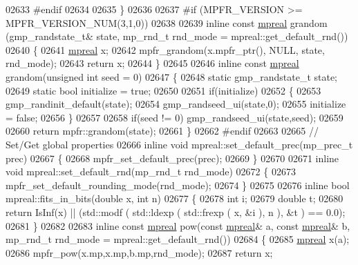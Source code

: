 \begin{DoxyCode}
{{02633 \textcolor{preprocessor}{#endif}
02634 
02635 \}
02636 
02637 \textcolor{preprocessor}{#if (MPFR\_VERSION >= MPFR\_VERSION\_NUM(3,1,0))}
02638 
02639 \textcolor{keyword}{inline} \textcolor{keyword}{const} \hyperlink{classmpfr_1_1mpreal}{mpreal} grandom (gmp\_randstate\_t& state, mp\_rnd\_t rnd\_mode = mpreal::get\_default\_rnd())
02640 \{
02641     \hyperlink{classmpfr_1_1mpreal}{mpreal} x;
02642     mpfr\_grandom(x.mpfr\_ptr(), NULL, state, rnd\_mode);
02643     \textcolor{keywordflow}{return} x;
02644 \}
02645 
02646 \textcolor{keyword}{inline} \textcolor{keyword}{const} \hyperlink{classmpfr_1_1mpreal}{mpreal} grandom(\textcolor{keywordtype}{unsigned} \textcolor{keywordtype}{int} seed = 0)
02647 \{
02648     \textcolor{keyword}{static} gmp\_randstate\_t state;
02649     \textcolor{keyword}{static} \textcolor{keywordtype}{bool} initialize = \textcolor{keyword}{true};
02650 
02651     \textcolor{keywordflow}{if}(initialize)
02652     \{
02653         gmp\_randinit\_default(state);
02654         gmp\_randseed\_ui(state,0);
02655         initialize = \textcolor{keyword}{false};
02656     \}
02657 
02658     \textcolor{keywordflow}{if}(seed != 0) gmp\_randseed\_ui(state,seed);
02659 
02660     \textcolor{keywordflow}{return} mpfr::grandom(state);
02661 \}
02662 \textcolor{preprocessor}{#endif}
02663 
02665 \textcolor{comment}{// Set/Get global properties}
02666 \textcolor{keyword}{inline} \textcolor{keywordtype}{void} mpreal::set\_default\_prec(mp\_prec\_t prec)
02667 \{
02668     mpfr\_set\_default\_prec(prec);
02669 \}
02670 
02671 \textcolor{keyword}{inline} \textcolor{keywordtype}{void} mpreal::set\_default\_rnd(mp\_rnd\_t rnd\_mode)
02672 \{
02673     mpfr\_set\_default\_rounding\_mode(rnd\_mode);
02674 \}
02675 
02676 \textcolor{keyword}{inline} \textcolor{keywordtype}{bool} mpreal::fits\_in\_bits(\textcolor{keywordtype}{double} x, \textcolor{keywordtype}{int} n)
02677 \{
02678     \textcolor{keywordtype}{int} i;
02679     \textcolor{keywordtype}{double} t;
02680     \textcolor{keywordflow}{return} IsInf(x) || (std::modf ( std::ldexp ( std::frexp ( x, &i ), n ), &t ) == 0.0);
02681 \}
02682 
02683 \textcolor{keyword}{inline} \textcolor{keyword}{const} \hyperlink{classmpfr_1_1mpreal}{mpreal} pow(\textcolor{keyword}{const} \hyperlink{classmpfr_1_1mpreal}{mpreal}& a, \textcolor{keyword}{const} \hyperlink{classmpfr_1_1mpreal}{mpreal}& b, mp\_rnd\_t rnd\_mode = 
      mpreal::get\_default\_rnd())
02684 \{
02685     \hyperlink{classmpfr_1_1mpreal}{mpreal} x(a);
02686     mpfr\_pow(x.mp,x.mp,b.mp,rnd\_mode);
02687     \textcolor{keywordflow}{return} x;
}}
\end{DoxyCode}
